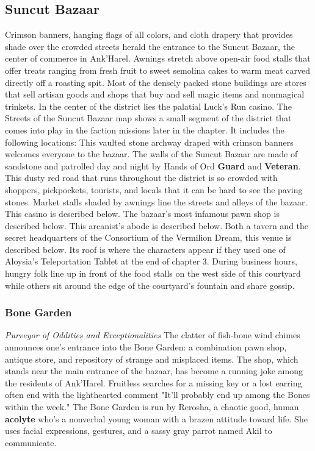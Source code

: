 \documentclass[10pt,a4,twoside,twocolumn,openany,nodeprecatedcode]{dndbook}
\begin{document}
\subsection{Suncut Bazaar}
Crimson banners, hanging flags of all colors, and cloth drapery that provides shade over the crowded streets herald the entrance to the Suncut Bazaar, the center of commerce in Ank'Harel. Awnings stretch above open-air food stalls that offer treats ranging from fresh fruit to sweet semolina cakes to warm meat carved directly off a roasting spit. Most of the densely packed stone buildings are stores that sell artisan goods and shops that buy and sell magic items and nonmagical trinkets. In the center of the district lies the palatial Luck's Run casino.
The Streets of the Suncut Bazaar map shows a small segment of the district that comes into play in the faction missions later in the chapter. It includes the following locations:
{{This vaulted stone archway draped with crimson banners welcomes everyone to the bazaar.}}
{{The walls of the Suncut Bazaar are made of sandstone and patrolled day and night by Hands of Ord \textbf{Guard} and \textbf{Veteran}.}}
{{This dusty red road that runs throughout the district is so crowded with shoppers, pickpockets, tourists, and locals that it can be hard to see the paving stones.}}
{{Market stalls shaded by awnings line the streets and alleys of the bazaar.}}
{{This casino is described below.}}
{{The bazaar's most infamous pawn shop is described below.}}
{{This arcanist's abode is described below.}}
{{Both a tavern and the secret headquarters of the Consortium of the Vermilion Dream, this venue is described below. Its roof is where the characters appear if they used one of Aloysia's Teleportation Tablet at the end of chapter 3.}}
{{During business hours, hungry folk line up in front of the food stalls on the west side of this courtyard while others sit around the edge of the courtyard's fountain and share gossip.}}
\subsubsection{Bone Garden}
\textit{Purveyor of Oddities and Exceptionalities}
The clatter of fish-bone wind chimes announces one's entrance into the Bone Garden: a combination pawn shop, antique store, and repository of strange and misplaced items. The shop, which stands near the main entrance of the bazaar, has become a running joke among the residents of Ank'Harel. Fruitless searches for a missing key or a lost earring often end with the lighthearted comment "It'll probably end up among the Bones within the week."
The Bone Garden is run by Rerosha, a chaotic good, human \textbf{acolyte} who's a nonverbal young woman with a brazen attitude toward life. She uses facial expressions, gestures, and a sassy gray parrot named Akil to communicate.
\end{document}
